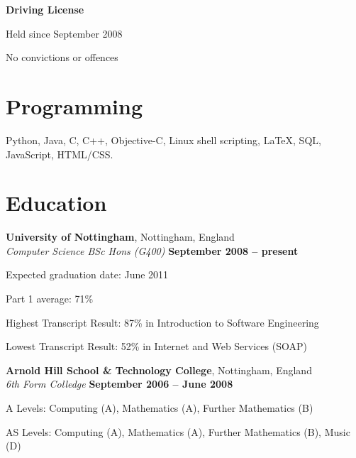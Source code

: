 \documentclass[margin,line]{resume}
\begin{document}
\begin{resume}
    \textbf{Driving License}\vspace{-4mm}\\%
    \begin{list2}
		\item Held since September 2008
		\item No convictions or offences
    \end{list2}
    
    \section{\mysidestyle Programming}

    Python, Java, C, C++, Objective-C, Linux shell scripting, \LaTeX, SQL, JavaScript, HTML/CSS.


    \section{\mysidestyle Education}

    \textbf{University of Nottingham}, Nottingham, England \vspace{2mm}\\\vspace{1mm}%
    \textsl{Computer Science BSc Hons (G400)} \hfill \textbf{September 2008 -- present}\vspace{-3mm}\\\vspace{-1mm}%
    \begin{list2}
        \item Expected graduation date: June 2011%
        \item Part 1 average: 71\%
        \item Highest Transcript Result: 87\% in Introduction to Software Engineering
        \item Lowest Transcript Result: 52\% in Internet and Web Services (SOAP)
    \end{list2}\vspace{-1.5mm}
    
    \textbf{Arnold Hill School \& Technology College}, Nottingham, England \vspace{2mm}\\\vspace{1mm}%
    \textsl{6th Form Colledge} \hfill \textbf{September 2006 -- June 2008}\vspace{-3mm}\\\vspace{-1mm}%
    \begin{list2}
        \item A Levels: Computing (A), Mathematics (A), Further Mathematics (B)%
        \item AS Levels: Computing (A), Mathematics (A), Further Mathematics (B), Music (D)%
    \end{list2}\vspace{-1.5mm}



\end{resume}
\end{document}
